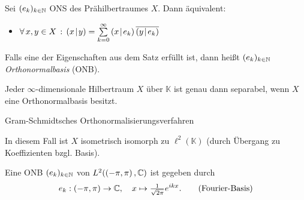 \documentclass{cheat-sheet}
\newcommand{\K}{\mathbb{K}}
\newcommand{\scp}[2]{\left( #1 \!\mid\! #2 \right)} %
\begin{document}
\begin{satz}
  Sei $(e_k)_{k \in \mathbb{N}}$ ONS des Prähilbertraumes $X$. Dann äquivalent:
  \begin{itemize}
    \vspace{4pt}
    \item $\fa{x, y \in X} \scp{x}{y} = \sum_{k=0}^\infty \scp{x}{e_k} \overline{\scp{y}{e_k}}$ 
  \end{itemize}
\end{satz}

\begin{defn}
  Falls eine der Eigenschaften aus dem Satz erfüllt ist, dann heißt $(e_k)_{k \in \mathbb{N}}$ \emph{Orthonormalbasis} (ONB).
\end{defn}

\begin{satz}
  Jeder $\infty$-dimensionale Hilbertraum $X$ über $\K$ ist genau dann separabel, wenn $X$ eine Orthonormalbasis besitzt.
\end{satz}

\begin{beweisidee}
  Gram-Schmidtsches Orthonormalisierungsverfahren
\end{beweisidee}

\begin{bem}
  In diesem Fall ist $X$ isometrisch isomorph zu $\ell^2(\K)$ (durch Übergang zu Koeffizienten bzgl. Basis).
\end{bem}



\begin{bsp}
  Eine ONB $(e_k)_{k \in \mathbb{N}}$ von $L^2(\left( -\pi, \pi \right), \mathbb{C})$ ist gegeben durch
  \[
    e_k : \left( -\pi, \pi \right) \to \mathbb{C}, \quad x \mapsto \tfrac{1}{\sqrt{2\pi}} e^{ikx}. \tag*{(Fourier-Basis)}
  \]

\end{bsp}
\end{document}
